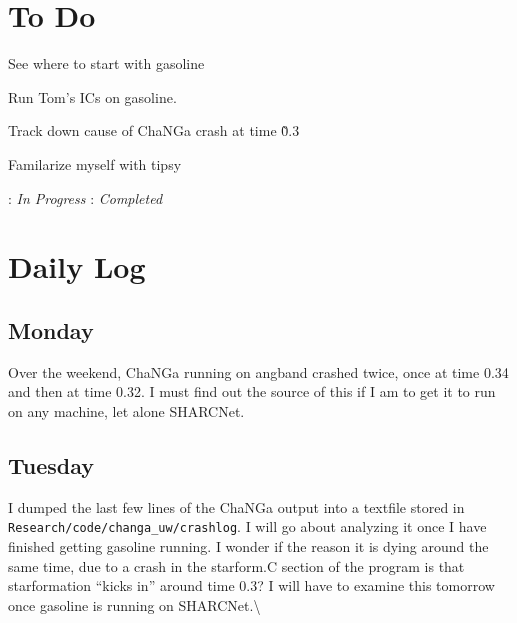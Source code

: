 \documentclass[11pt,letterpaper]{article}
\begin{document}
\section{To Do}
\begin{bullets}
\item[\checkmark] See where to start with gasoline
\item[\textleaf] Run Tom's ICs on gasoline.
\item Track down cause of ChaNGa crash at time \~0.3
\item Familarize myself with tipsy
\end{bullets}

\textleaf : \textit{In Progress} \qquad \checkmark : \textit{Completed}
\section{Daily Log}

\subsection{Monday}

Over the weekend, ChaNGa running on angband crashed twice, once at time
0.34 and then at time 0.32. I must find out the source of this if I am
to get it to run on any machine, let alone SHARCNet.

\subsection{Tuesday}

I dumped the last few lines of the ChaNGa output into a textfile stored
in \verb!Research/code/changa_uw/crashlog!. I will go about analyzing it
once I have finished getting gasoline running. I wonder if the reason it
is dying around the same time, due to a crash in the starform.C section
of the program is that starformation ``kicks in'' around time 0.3? I
will have to examine this tomorrow once gasoline is running on
SHARCNet.\textbackslash{}
\end{document}
